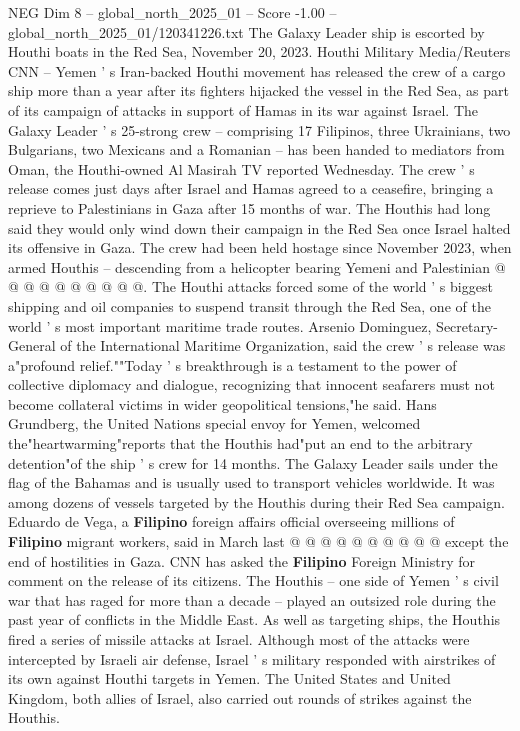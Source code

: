 \begin{textsample}{NEG Dim 8 – global\_north\_2025\_01 – Score -1.00 – global\_north\_2025\_01/120341226.txt}  \label{ex:f8_neg_346}
The Galaxy Leader ship is escorted by Houthi boats in the Red Sea, November 20, 2023.
Houthi Military Media/Reuters CNN -- Yemen ' s Iran-backed Houthi movement has released the crew of a cargo ship more than a year after its fighters hijacked the vessel in the Red Sea, as part of its campaign of attacks in support of Hamas in its war against Israel.
The Galaxy Leader ' s 25-strong crew -- comprising 17 Filipinos, three Ukrainians, two Bulgarians, two Mexicans and a Romanian -- has been handed to mediators from Oman, the Houthi-owned Al Masirah TV reported Wednesday.
The crew ' s release comes just days after Israel and Hamas agreed to a ceasefire, bringing a reprieve to Palestinians in Gaza after 15 months of war.
The Houthis had long said they would only wind down their campaign in the Red Sea once Israel halted its offensive in Gaza.
The crew had been held hostage since November 2023, when armed Houthis -- descending from a helicopter bearing Yemeni and Palestinian @ @ @ @ @ @ @ @ @ @.
The Houthi attacks forced some of the world ' s biggest shipping and oil companies to suspend transit through the Red Sea, one of the world ' s most important maritime trade routes.
Arsenio Dominguez, Secretary-General of the International Maritime Organization, said the crew ' s release was a"profound relief.""Today ' s breakthrough is a testament to the power of collective diplomacy and dialogue, recognizing that innocent seafarers must not become collateral victims in wider geopolitical tensions,"he said.
Hans Grundberg, the United Nations special envoy for Yemen, welcomed the"heartwarming"reports that the Houthis had"put an end to the arbitrary detention"of the ship ' s crew for 14 months.
The Galaxy Leader sails under the flag of the Bahamas and is usually used to transport vehicles worldwide.
It was among dozens of vessels targeted by the Houthis during their Red Sea campaign.
Eduardo de Vega, a \textbf{Filipino} foreign affairs official overseeing millions of \textbf{Filipino} migrant workers, said in March last @ @ @ @ @ @ @ @ @ @ except the end of hostilities in Gaza.
CNN has asked the \textbf{Filipino} Foreign Ministry for comment on the release of its citizens.
The Houthis -- one side of Yemen ' s civil war that has raged for more than a decade -- played an outsized role during the past year of conflicts in the Middle East.
As well as targeting ships, the Houthis fired a series of missile attacks at Israel.
Although most of the attacks were intercepted by Israeli air defense, Israel ' s military responded with airstrikes of its own against Houthi targets in Yemen.
The United States and United Kingdom, both allies of Israel, also carried out rounds of strikes against the Houthis.

\end{textsample}
